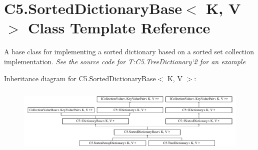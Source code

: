 \hypertarget{class_c5_1_1_sorted_dictionary_base}{}\section{C5.\+Sorted\+Dictionary\+Base$<$ K, V $>$ Class Template Reference}
\label{class_c5_1_1_sorted_dictionary_base}


A base class for implementing a sorted dictionary based on a sorted set collection implementation. {\itshape See the source code for T\+:\+C5.\+Tree\+Dictionary`2 for an example}  


Inheritance diagram for C5.\+Sorted\+Dictionary\+Base$<$ K, V $>$\+:\begin{figure}[H]
\begin{center}
\leavevmode
\includegraphics[height=3.286385cm]{class_c5_1_1_sorted_dictionary_base}
\end{center}
\end{figure}
